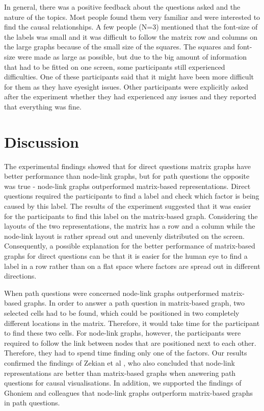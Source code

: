 \documentclass{l4proj}
\begin{document}
In general, there was a positive feedback about the questions asked and the nature of the topics. Most people found them very familiar and were interested to find the causal relationships. A few people (N=3) mentioned that the font-size of the labels was small and it was difficult to follow the matrix row and columns on the large graphs because of the small size of the squares. The squares and font-size were made as large as possible, but due to the big amount of information that had to be fitted on one screen, some participants still experienced difficulties. One of these participants said that it might have been more difficult for them as they have eyesight issues. Other participants were explicitly asked after the experiment whether they had experienced any issues and they reported that everything was fine.

\chapter{Discussion}

The experimental findings showed that for direct questions matrix graphs have better performance than node-link graphs, but for path questions the opposite was true - node-link graphs outperformed matrix-based representations. Direct questions required the participants to find a label and check which factor is being caused by this label. The results of the experiment suggested that it was easier for the participants to find this label on the matrix-based graph. Considering the layouts of the two representations, the matrix has a row and a column while the node-link layout is rather spread out and unevenly distributed on the screen. Consequently, a possible explanation for the better performance of matrix-based graphs for direct questions can be that it is easier for the human eye to find a label in a row rather than on a flat space where factors are spread out in different directions. 

When path questions were concerned node-link graphs outperformed matrix-based graphs. In order to answer a path question in matrix-based graph, two selected cells had to be found, which could be positioned in two completely different locations in the matrix. Therefore, it would take time for the participant to find these two cells. For node-link graphs, however, the participants were required to follow the link between nodes that are positioned next to each other. Therefore, they had to spend time finding only one of the factors. Our results confirmed the findings of Zekian et al \cite{sheny2007path}, who also concluded that node-link representations are better than matrix-based graphs when answering path questions for causal visualisations. In addition, we supported the findings of Ghoniem and colleagues \cite{ghoniem2004comparison} that node-link graphs outperform matrix-based graphs in path questions.
\end{document}
